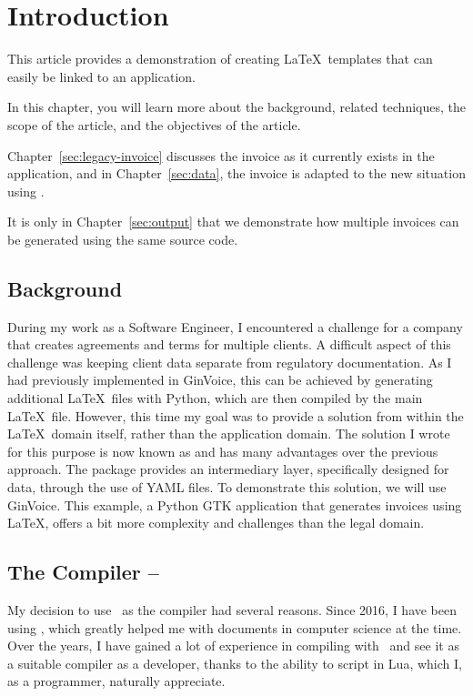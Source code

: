 \section{Introduction}
This article provides a demonstration of creating \LaTeX\ templates that can easily be linked to an application.

In this chapter, you will learn more about the background, related techniques, the scope of the article, and the objectives of the article.

Chapter~\ref{sec:legacy-invoice} discusses the invoice as it currently exists in the application, and in Chapter~\ref{sec:data}, the invoice is adapted to the new situation using \cite{lua-placeholders}.

It is only in Chapter~\ref{sec:output} that we demonstrate how multiple invoices can be generated using the same source code.

\subsection{Background}
During my work as a Software Engineer, I encountered a challenge for a company that creates agreements and terms for multiple clients.
A difficult aspect of this challenge was keeping client data separate from regulatory documentation.
As I had previously implemented in GinVoice, this can be achieved by generating additional \LaTeX\ files with Python, which are then compiled by the main \LaTeX\ file.
However, this time my goal was to provide a solution from within the \LaTeX\ domain itself, rather than the application domain.
The solution I wrote for this purpose is now known as  and has many advantages over the previous approach.
The package provides an intermediary layer, specifically designed for data, through the use of YAML files.
To demonstrate this solution, we will use GinVoice\cite{ginvoice}.
This example, a Python GTK application that generates invoices using \LaTeX, offers a bit more complexity and challenges than the legal domain.

\subsection{The Compiler -- \LuaLaTeX}
My decision to use \LuaLaTeX\ as the compiler had several reasons.
Since 2016, I have been using \LuaLaTeX, which greatly helped me with documents in computer science at the time.
Over the years, I have gained a lot of experience in compiling with \LuaLaTeX\ and see it as a suitable compiler as a developer, thanks to the ability to script in Lua, which I, as a programmer, naturally appreciate.

